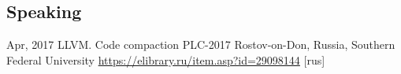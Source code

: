 \documentclass[11pt,a4paper]{moderncv}
\newcommand{\EngRus}[2]{#1}
\newcommand{\BirthPlaceOfValour}{\EngRus{Rostov-on-Don, Russia}{Ростов-на-Дону, Россия}}
\begin{document}
  \subsection{\EngRus{Speaking}{Конференции}}
    \cventry
      {\EngRus{Apr}{Апрель}, 2017}
      {\EngRus{LLVM. Code compaction}{Преобразование по уплотнению кода в LLVM}}
      {\EngRus{PLC-2017}{Языки программирования и компиляторы 2017}}
      {\BirthPlaceOfValour, \EngRus{Southern Federal University}{Южный Федеральный Университет}}
      {\newline\url{https://elibrary.ru/item.asp?id=29098144} \EngRus{[rus]}{}}
      {}{}
\end{document}
